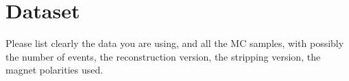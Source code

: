 \section{Dataset}
Please list clearly the data you are using, 
and all the MC samples, with possibly 
the number of events, the reconstruction version, 
the stripping version, the magnet polarities
used.